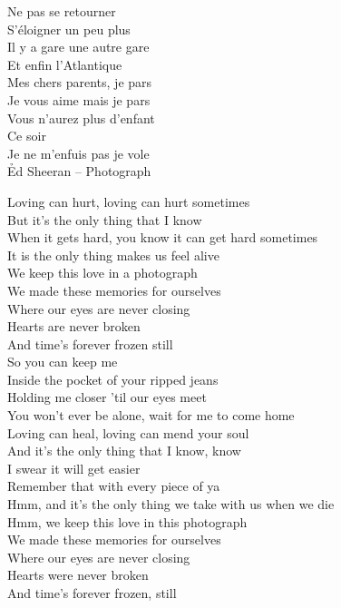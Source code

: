 \documentclass{novel}
\begin{document}
Ne pas se retourner \\
S'éloigner un peu plus \\
Il y a gare une autre gare \\
Et enfin l'Atlantique \\

Mes chers parents, je pars \\
Je vous aime mais je pars \\
Vous n'aurez plus d'enfant \\
Ce soir \\
Je ne m'enfuis pas je vole \\


\newpage
\normalsize
\h*{Ed Sheeran – Photograph}
\begin{multicols}{2}
Loving can hurt, loving can hurt sometimes \\
But it's the only thing that I know \\

When it gets hard, you know it can get hard sometimes \\
It is the only thing makes us feel alive \\

We keep this love in a photograph \\
We made these memories for ourselves \\
Where our eyes are never closing \\
Hearts are never broken \\
And time's forever frozen still \\

So you can keep me \\
Inside the pocket of your ripped jeans \\
Holding me closer 'til our eyes meet \\
You won't ever be alone, wait for me to come home \\

Loving can heal, loving can mend your soul \\
And it's the only thing that I know, know \\
I swear it will get easier \\
Remember that with every piece of ya \\
Hmm, and it's the only thing we take with us when we die \\

Hmm, we keep this love in this photograph \\
We made these memories for ourselves \\
Where our eyes are never closing \\
Hearts were never broken \\
And time's forever frozen, still \\


\end{multicols}
\end{document}
